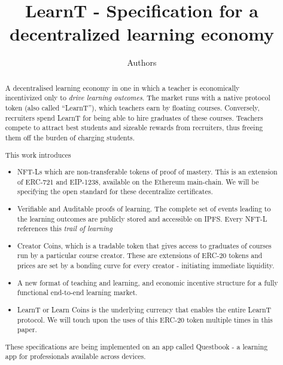 \documentclass{article}
\author{Authors}
\title{LearnT - Specification for a decentralized learning economy}
\begin{document}
  \maketitle
  \begin{abstract}
    A decentralised learning economy in one in which a teacher is economically incentivized only to \textit{drive learning outcomes}.
    The market runs  with a native protocol token (also called “LearnT”), which teachers earn by floating courses. 
    Conversely, recruiters spend LearnT for being able to hire graduates of these courses. 
    Teachers compete to attract best students and sizeable rewards from recruiters, thus freeing them off the burden of charging students. 
    \par
    This work introduces
    \begin{itemize}
      \item NFT-Ls which are non-transferable tokens of proof of mastery. 
        This is an extension of ERC-721 and EIP-1238, available on the Ethereum main-chain. 
        We will be specifying the open standard for these decentralize certificates.
      \item Verifiable and Auditable proofs of learning. 
        The complete set of events leading to the learning outcomes are publicly stored and accessible on IPFS.
        Every NFT-L references this \textit{trail of learning}
      \item Creator Coins, which is a tradable token that gives access to graduates of courses run by a particular course creator.
        These are extensions of ERC-20 tokens and prices are set by a bonding curve for every creator - initiating immediate liquidity.
      \item A new format of teaching and learning, and economic incentive structure for a fully functional end-to-end learning market.
      \item LearnT or Learn Coins is the underlying currency that enables the entire LearnT protocol. 
        We will touch upon the uses of this ERC-20 token multiple times in this paper.
    \end{itemize}
    \par
    These specifications are being implemented on an app called Questbook - a learning app for professionals available across devices.

  \end{abstract}
\end{document}
